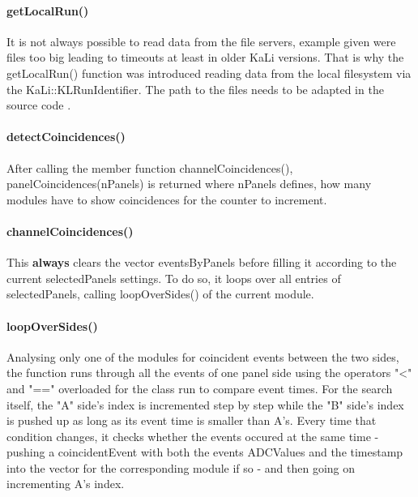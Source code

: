    \paragraph{getLocalRun()}
    \label{ch:Analysis software:sec:methods of the class run:subsec:getLocalRun()}
    
    It is not always possible to read data from the file servers, example given were files too big leading to timeouts at least in older KaLi versions. That is why the getLocalRun() function was introduced reading data from the local filesystem via the KaLi::KLRunIdentifier. The path to the files needs to be adapted in the source code .
    
    \paragraph{detectCoincidences()}
    \label{ch:Analysis software:sec:methods of the class run:subsec:detectCoincidences()}
    
    After calling the member function channelCoincidences(), panelCoincidences(nPanels) is returned where nPanels defines, how many modules have to show coincidences for the counter to increment. 
    
    \paragraph{channelCoincidences()}
    \label{ch:Analysis software:sec:methods of the class run:subsec:channelCoincidences()}
    This {\bf always} clears the vector eventsByPanels before filling it according to the current selectedPanels settings. To do so, it loops over all entries of selectedPanels, calling loopOverSides() of the current module.
    
    \paragraph{loopOverSides()}
    \label{ch:Analysis software:sec:methods of the class run:subsec:loopOverSides()}
    
    Analysing only one of the modules for coincident events between the two sides, the function runs through all the events of one panel side using the operators "<" and "==" overloaded for the class run to compare event times. For the search itself, the "A" side's index is incremented step by step while the "B" side's index is pushed up as long as its event time is smaller than A's. Every time that condition changes, it checks whether the events occured at the same time - pushing a coincidentEvent with both the events ADCValues and the timestamp into the vector for the corresponding module if so - and then going on incrementing A's index.
    
